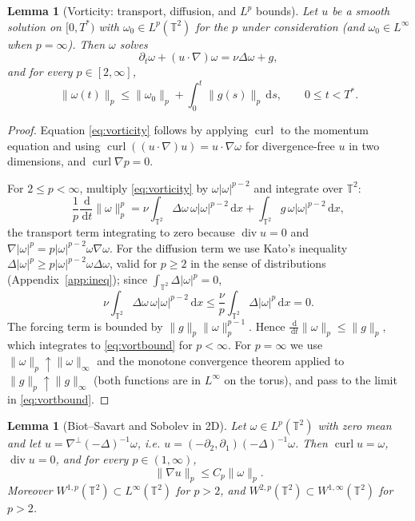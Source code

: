 \documentclass[11pt]{article}
\newtheorem{lemma}[theorem]{Lemma}
\theoremstyle{remark}
\newcommand{\T}{\mathbb{T}}
\newcommand{\dd}{\,\mathrm{d}}
\newcommand{\norm}[1]{\lVert #1\rVert}
\newcommand{\abs}[1]{\lvert #1\rvert}
\newcommand{\Div}{\operatorname{div}}
\newcommand{\curl}{\operatorname{curl}}
\begin{document}
\begin{lemma}[Vorticity: transport, diffusion, and $L^p$ bounds]\label{lem:vorticity}
Let $u$ be a smooth solution on $[0,T^*)$ with $\omega_0\in L^p(\T^2)$ for the $p$ under
consideration (and $\omega_0\in L^\infty$ when $p=\infty$). Then $\omega$ solves
\begin{equation}\label{eq:vorticity}
\partial_t\omega+(u\cdot\nabla)\omega=\nu\Delta\omega+g,
\end{equation}
and for every $p\in[2,\infty]$,
\begin{equation}\label{eq:vortbound}
\norm{\omega(t)}_{p}\le\norm{\omega_0}_{p}+\int_0^t\norm{g(s)}_{p}\dd s,
\qquad 0\le t<T^*.
\end{equation}
\end{lemma}

\begin{proof}
Equation \eqref{eq:vorticity} follows by applying $\curl$ to the momentum equation and using
$\curl((u\cdot\nabla)u)=u\cdot\nabla\omega$ for divergence-free $u$ in two dimensions, and
$\curl\nabla p=0$.

For $2\le p<\infty$, multiply \eqref{eq:vorticity} by $\omega\abs{\omega}^{p-2}$ and
integrate over $\T^2$:
\[
\frac1p\frac{\dd}{\dd t}\norm{\omega}_{p}^{p}
=\nu\int_{\T^2}\Delta\omega\,\omega\abs{\omega}^{p-2}\dd x
+\int_{\T^2}g\,\omega\abs{\omega}^{p-2}\dd x,
\]
the transport term integrating to zero because $\Div u=0$ and $\nabla\abs{\omega}^{p}=p\abs{\omega}^{p-2}\omega\nabla\omega$. For the
diffusion term we use Kato's inequality
$\Delta\abs{\omega}^{p}\ge p\abs{\omega}^{p-2}\omega\Delta\omega$, valid for $p\ge2$ in the
sense of distributions (Appendix~\ref{app:ineq}); since $\int_{\T^2}\Delta\abs{\omega}^{p}=0$,
\[
\nu\int_{\T^2}\Delta\omega\,\omega\abs{\omega}^{p-2}\dd x
\le\frac{\nu}{p}\int_{\T^2}\Delta\abs{\omega}^{p}\dd x=0 .
\]
The forcing term is bounded by $\norm{g}_{p}\norm{\omega}_{p}^{p-1}$. Hence
$\frac{\dd}{\dd t}\norm{\omega}_{p}\le\norm{g}_{p}$, which integrates to \eqref{eq:vortbound}
for $p<\infty$. For $p=\infty$ we use
$\norm{\omega}_{p}\uparrow\norm{\omega}_{\infty}$ and the monotone convergence theorem
applied to $\norm{g}_{p}\uparrow\norm{g}_{\infty}$ (both functions are in
$L^\infty$ on the torus), and pass to the limit in \eqref{eq:vortbound}.
\end{proof}

\begin{lemma}[Biot--Savart and Sobolev in 2D]\label{lem:biot}
Let $\omega\in L^p(\T^2)$ with zero mean and let $u=\nabla^\perp(-\Delta)^{-1}\omega$, i.e.
$u=(-\partial_2,\partial_1)(-\Delta)^{-1}\omega$. Then $\curl u=\omega$, $\Div u=0$, and for
every $p\in(1,\infty)$,
\begin{equation}\label{eq:biot}
\norm{\nabla u}_{p}\le C_p\norm{\omega}_{p}.
\end{equation}
Moreover $W^{1,p}(\T^2)\subset L^\infty(\T^2)$ for $p>2$, and
$W^{2,p}(\T^2)\subset W^{1,\infty}(\T^2)$ for $p>2$.
\end{lemma}
\end{document}
